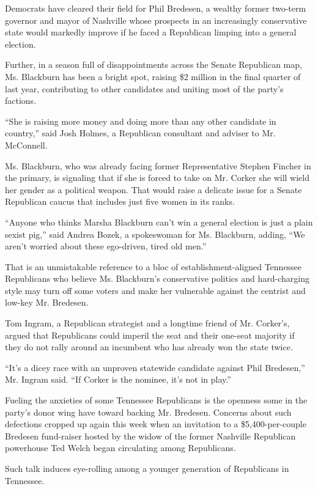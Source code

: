 Democrats have cleared their field for Phil Bredesen, a wealthy former
two-term governor and mayor of Nashville whose prospects in an
increasingly conservative state would markedly improve if he faced a
Republican limping into a general election.

Further, in a season full of disappointments across the Senate
Republican map, Ms. Blackburn has been a bright spot, raising \$2
million in the final quarter of last year, contributing to other
candidates and uniting most of the party's factions.

``She is raising more money and doing more than any other candidate in
country,'' said Josh Holmes, a Republican consultant and adviser to Mr.
McConnell.

Ms. Blackburn, who was already facing former Representative Stephen
Fincher in the primary, is signaling that if she is forced to take on
Mr. Corker she will wield her gender as a political weapon. That would
raise a delicate issue for a Senate Republican caucus that includes just
five women in its ranks.

``Anyone who thinks Marsha Blackburn can't win a general election is
just a plain sexist pig,'' said Andrea Bozek, a spokeswoman for Ms.
Blackburn, adding, ``We aren't worried about these ego-driven, tired old
men.''

That is an unmistakable reference to a bloc of establishment-aligned
Tennessee Republicans who believe Ms. Blackburn's conservative politics
and hard-charging style may turn off some voters and make her vulnerable
against the centrist and low-key Mr. Bredesen.

Tom Ingram, a Republican strategist and a longtime friend of Mr.
Corker's, argued that Republicans could imperil the seat and their
one-seat majority if they do not rally around an incumbent who has
already won the state twice.

``It's a dicey race with an unproven statewide candidate against Phil
Bredesen,'' Mr. Ingram said. ``If Corker is the nominee, it's not in
play.''

Fueling the anxieties of some Tennessee Republicans is the openness some
in the party's donor wing have toward backing Mr. Bredesen. Concerns
about such defections cropped up again this week when an invitation to a
\$5,400-per-couple Bredesen fund-raiser hosted by the widow of the
former Nashville Republican powerhouse Ted Welch began circulating among
Republicans.

Such talk induces eye-rolling among a younger generation of Republicans
in Tennessee.

